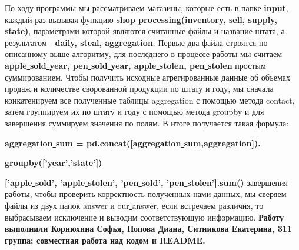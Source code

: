 \documentclass{article}
\begin{document}
По ходу программы мы рассматриваем магазины, которые есть в папке \textbf{input}, 
каждый раз вызывая функцию \textbf{shop\underline{ }processing(inventory, sell, supply, state)}, 
параметрами которой являются считанные файлы и название штата, 
а результатом - \textbf{daily, steal, aggregation}. 
\newline Первые два файла строятся по описанному выше алгоритму, 
для последнего в процессе работы мы считаем \textbf{apple\underline{ }sold\underline{ }year, pen\underline{ }sold\underline{ }year, apple\underline{ }stolen, pen\underline{ }stolen} простым суммированием.
Чтобы получить исходные агрегированные данные об объемах продаж и количестве сворованной продукции 
по штату и году, мы сначала конкатенируем все полученные таблицы aggregation  с помощью метода contact,
затем группируем их по штату и году с помощью метода groupby и для завершения суммируем значения по полям.
\newline В итоге получается такая формула:

\textbf{aggregation\underline{ }sum = pd.concat([aggregation\underline{ }sum,aggregation]).}

\textbf{groupby(['year','state'])}

\textbf{['apple\underline{ }sold', 'apple\underline{ }stolen', 'pen\underline{ }sold', 'pen\underline{ }stolen'].sum()}
 завершения работы, чтобы проверить корректность полученных нами данных, 
мы сверяем файлы из двух папок answer и our\underline{ }answer, 
если встречаем различия, то выбрасываем исключение и выводим соответствующую информацию. 
\newline \newline\textbf{Работу выполнили Корнюхина Софья, Попова Диана, Ситникова Екатерина, 
311 группа; совместная работа над кодом и README.}
\end{document}
